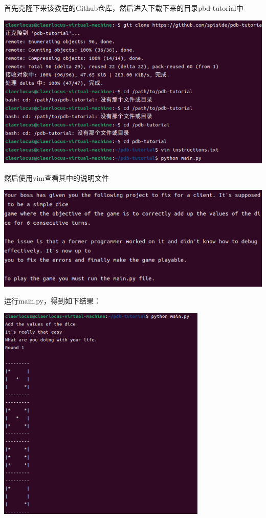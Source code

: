 \documentclass[UTF8,a4paper]{ctexart}
\begin{document}
\begin{sloppypar}
	首先克隆下来该教程的Github仓库，然后进入下载下来的目录pbd-tutorial中
	
	\includegraphics[width = 14cm]{3}

	然后使用vim查看其中的说明文件

	\includegraphics[width = 14cm]{4}
	
	运行main.py，得到如下结果：
	
	\includegraphics[width = 10cm]{6}
	

\end{sloppypar}
\end{document}
